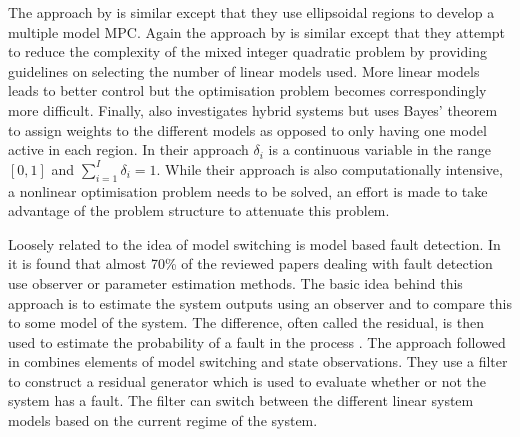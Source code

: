 The approach by \cite{ozkan} is similar except that they use ellipsoidal regions to develop a multiple model MPC. Again the approach by \cite{kvasnica} is similar except that they attempt to reduce the complexity of the mixed integer quadratic problem by providing guidelines on selecting the number of linear models used. More linear models leads to better control but the optimisation problem becomes correspondingly more difficult. Finally, \cite {nandola} also investigates hybrid systems but uses Bayes' theorem to assign weights to the different models as opposed to only having one model active in each region. In their approach $\delta_i$ is a continuous variable in the range $[0, 1]$ and $\sum_{i=1}^I \delta_i = 1$. While their approach is also computationally intensive, a nonlinear optimisation problem needs to be solved, an effort is made to take advantage of the problem structure to attenuate this problem.

Loosely related to the idea of model switching is model based fault detection. In \cite{isermann} it is found that almost 70\% of the reviewed papers dealing with fault detection use observer or parameter estimation methods. The basic idea behind this approach is to estimate the system outputs using an observer and to compare this to some model of the system. The difference, often called the residual, is then used to estimate the probability of a fault in the process \cite{edwards}. The approach followed in \cite{wang} combines elements of model switching and state observations. They use a filter to construct a residual generator which is used to evaluate whether or not the system has a fault. The filter can switch between the different linear system models based on the current regime of the system. 

